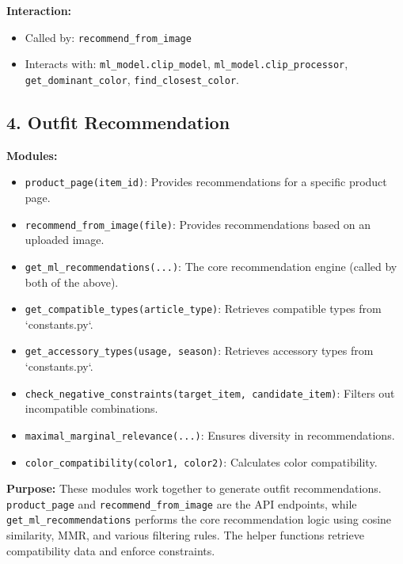 \documentclass[12pt,a4paper]{article}
\begin{document}
\textbf{Interaction:}
\begin{itemize}
    \item Called by: \texttt{recommend\_from\_image}
    \item Interacts with:  \texttt{ml\_model.clip\_model}, \texttt{ml\_model.clip\_processor}, \texttt{get\_dominant\_color}, \texttt{find\_closest\_color}.
\end{itemize}

\subsection*{4. Outfit Recommendation}

\textbf{Modules:}
\begin{itemize}
    \item \texttt{product\_page(item\_id)}:  Provides recommendations for a specific product page.
    \item \texttt{recommend\_from\_image(file)}:  Provides recommendations based on an uploaded image.
    \item \texttt{get\_ml\_recommendations(...)}:  The core recommendation engine (called by both of the above).
    \item \texttt{get\_compatible\_types(article\_type)}: Retrieves compatible types from `constants.py`.
    \item \texttt{get\_accessory\_types(usage, season)}: Retrieves accessory types from `constants.py`.
     \item \texttt{check\_negative\_constraints(target\_item, candidate\_item)}:  Filters out incompatible combinations.
    \item \texttt{maximal\_marginal\_relevance(...)}: Ensures diversity in recommendations.
    \item \texttt{color\_compatibility(color1, color2)}: Calculates color compatibility.

\end{itemize}

\textbf{Purpose:} These modules work together to generate outfit recommendations. \texttt{product\_page} and \texttt{recommend\_from\_image} are the API endpoints, while \texttt{get\_ml\_recommendations} performs the core recommendation logic using cosine similarity, MMR, and various filtering rules. The helper functions retrieve compatibility data and enforce constraints.
\end{document}
